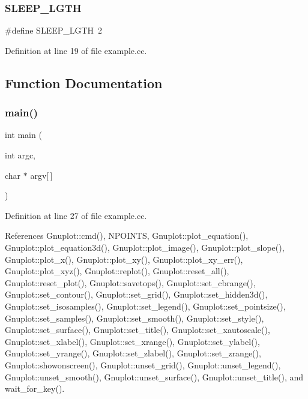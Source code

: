 \subsubsection{S\+L\+E\+E\+P\+\_\+\+L\+G\+TH}
{\footnotesize\ttfamily \#define S\+L\+E\+E\+P\+\_\+\+L\+G\+TH~2}



Definition at line 19 of file example.\+cc.



\subsection{Function Documentation}
\mbox{\label{example_8cc_a0ddf1224851353fc92bfbff6f499fa97}} 
\subsubsection{main()}
{\footnotesize\ttfamily int main (\begin{DoxyParamCaption}\item[{int}]{argc,  }\item[{char $\ast$}]{argv[$\,$] }\end{DoxyParamCaption})}



Definition at line 27 of file example.\+cc.



References Gnuplot\+::cmd(), N\+P\+O\+I\+N\+TS, Gnuplot\+::plot\+\_\+equation(), Gnuplot\+::plot\+\_\+equation3d(), Gnuplot\+::plot\+\_\+image(), Gnuplot\+::plot\+\_\+slope(), Gnuplot\+::plot\+\_\+x(), Gnuplot\+::plot\+\_\+xy(), Gnuplot\+::plot\+\_\+xy\+\_\+err(), Gnuplot\+::plot\+\_\+xyz(), Gnuplot\+::replot(), Gnuplot\+::reset\+\_\+all(), Gnuplot\+::reset\+\_\+plot(), Gnuplot\+::savetops(), Gnuplot\+::set\+\_\+cbrange(), Gnuplot\+::set\+\_\+contour(), Gnuplot\+::set\+\_\+grid(), Gnuplot\+::set\+\_\+hidden3d(), Gnuplot\+::set\+\_\+isosamples(), Gnuplot\+::set\+\_\+legend(), Gnuplot\+::set\+\_\+pointsize(), Gnuplot\+::set\+\_\+samples(), Gnuplot\+::set\+\_\+smooth(), Gnuplot\+::set\+\_\+style(), Gnuplot\+::set\+\_\+surface(), Gnuplot\+::set\+\_\+title(), Gnuplot\+::set\+\_\+xautoscale(), Gnuplot\+::set\+\_\+xlabel(), Gnuplot\+::set\+\_\+xrange(), Gnuplot\+::set\+\_\+ylabel(), Gnuplot\+::set\+\_\+yrange(), Gnuplot\+::set\+\_\+zlabel(), Gnuplot\+::set\+\_\+zrange(), Gnuplot\+::showonscreen(), Gnuplot\+::unset\+\_\+grid(), Gnuplot\+::unset\+\_\+legend(), Gnuplot\+::unset\+\_\+smooth(), Gnuplot\+::unset\+\_\+surface(), Gnuplot\+::unset\+\_\+title(), and wait\+\_\+for\+\_\+key().


